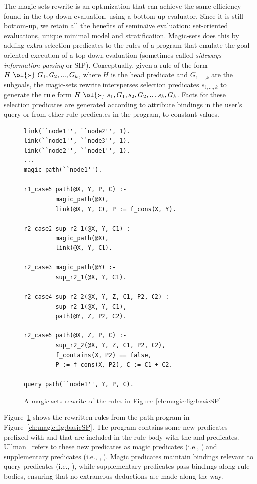 The magic-sets rewrite is an optimization that can achieve the same
efficiency found in the top-down evaluation, using a bottom-up evaluator.
Since it is still bottom-up, we retain all the benefits of semina\"{\i}ve
evaluation: set-oriented evaluations, unique minimal model and stratification.
Magic-sets does this by adding extra selection predicates to the rules of a
program that emulate the goal-oriented execution of a top-down evaluation
(sometimes called {\em sideways information passing} or SIP).  Conceptually,
given a rule of the form $H\ \text{\ol{:-}}\ G_1, G_2, ..., G_k$, where $H$ is
the head predicate and $G_{1,...,k}$ are the subgoals, the magic-sets rewrite
intersperses selection predicates $s_{1,...,k}$ to generate the rule form $H\
\text{\ol{:-}}\ s_1, G_1, s_2, G_2, ..., s_{k}, G_k$.  Facts for these
selection predicates are generated according to attribute bindings in the
user's query or from other rule predicates in the program, to constant values.

\begin{figure}
\centering
\ssp
\begin{lstlisting}
link(``node1'', ``node2'', 1).
link(``node1'', ``node3'', 1).
link(``node2'', ``node1'', 1).
...
magic_path(``node1'').

r1_case5 path(@X, Y, P, C) :-
         magic_path(@X),
         link(@X, Y, C), P := f_cons(X, Y).

r2_case2 sup_r2_1(@X, Y, C1) :-
         magic_path(@X),
         link(@X, Y, C1).

r2_case3 magic_path(@Y) :-
         sup_r2_1(@X, Y, C1).

r2_case4 sup_r2_2(@X, Y, Z, C1, P2, C2) :-
         sup_r2_1(@X, Y, C1),
         path(@Y, Z, P2, C2).

r2_case5 path(@X, Z, P, C) :-
         sup_r2_2(@X, Y, Z, C1, P2, C2),
         f_contains(X, P2) == false,
         P := f_cons(X, P2), C := C1 + C2.

query path(``node1'', Y, P, C).
\end{lstlisting}
\caption{\label{ch:magic:fig:magicSP}A magic-sets rewrite of 
the rules in Figure~\ref{ch:magic:fig:basicSP}.}
\end{figure}

Figure~\ref{ch:magic:fig:magicSP} shows the rewritten rules from the path
program in Figure~\ref{ch:magic:fig:basicSP}.  The program contains some new
predicates prefixed with \ol{magic\_} and \ol{sup\_} that are included in the
rule body with the \ol{link} and \ol{path} predicates.
Ullman~\cite{ullmanbook} refers to these new predicates as magic predicates
(i.e., \ol{magic\_path}) and supplementary predicates (i.e., \ol{sup\_r2\_1},
\ol{sup\_r2\_2}).  Magic predicates maintain bindings relevant to query
predicates (i.e., \ol{path}), while supplementary predicates pass bindings
along rule bodies, ensuring that no extraneous deductions are made along the
way.

